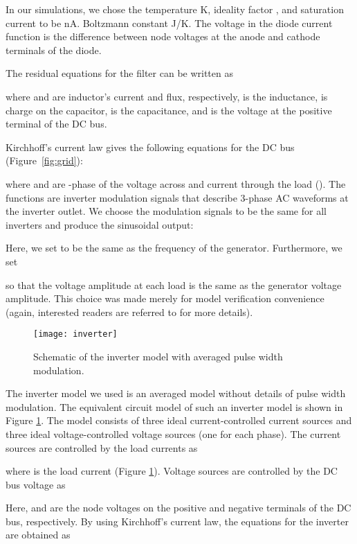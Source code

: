 \documentclass[10pt]{ijnam}
\theoremstyle{definition}
\begin{document}
In our simulations, we chose the temperature K, ideality factor , 
and saturation current to be nA. Boltzmann constant 
 J/K. The voltage  in the
diode current function is the difference between node voltages at the anode
and cathode terminals of the diode.

The residual equations for the filter can be written as

where  and  are inductor's current and flux, respectively, 
 is the inductance,  is charge on the capacitor,  is the 
capacitance, and  is the voltage at the positive terminal of the DC bus.

Kirchhoff's current law gives the following equations for the DC bus (Figure~\ref{fig:grid}):

where  and  are -phase of the 
voltage across and current through the load  ().
The functions  are inverter modulation signals that
describe 3-phase AC waveforms at the inverter outlet. We choose the modulation 
signals to be the same for all inverters and produce the sinusoidal output:

Here, we set  to be the same as the frequency of the 
generator. Furthermore, we set

so that the voltage amplitude at each load is the same as the generator 
voltage amplitude. This choice was made merely for model verification 
convenience (again, interested readers are referred to \cite{erickson2001} for more details). 

\begin{figure}[htb]
    \centering
    \texttt{[image: inverter]}
    \caption{Schematic of the inverter model with averaged pulse width modulation.}
    \label{fig:inverter_averaged}
\end{figure}

The inverter model we used is an averaged model without details of 
pulse width modulation. The equivalent circuit model of such an
inverter model is shown in Figure \ref{fig:inverter_averaged}. 
The model consists of three ideal current-controlled current sources 
and three ideal voltage-controlled voltage sources (one for each phase). 
The current sources are controlled by the load currents as

where  is the load current (Figure \ref{fig:inverter_averaged}).
Voltage sources are controlled by the DC bus voltage as

Here,  and  are the node voltages on the positive and negative terminals of 
the DC bus, respectively. By using Kirchhoff's current law, the equations for 
the inverter are obtained as
\end{document}
